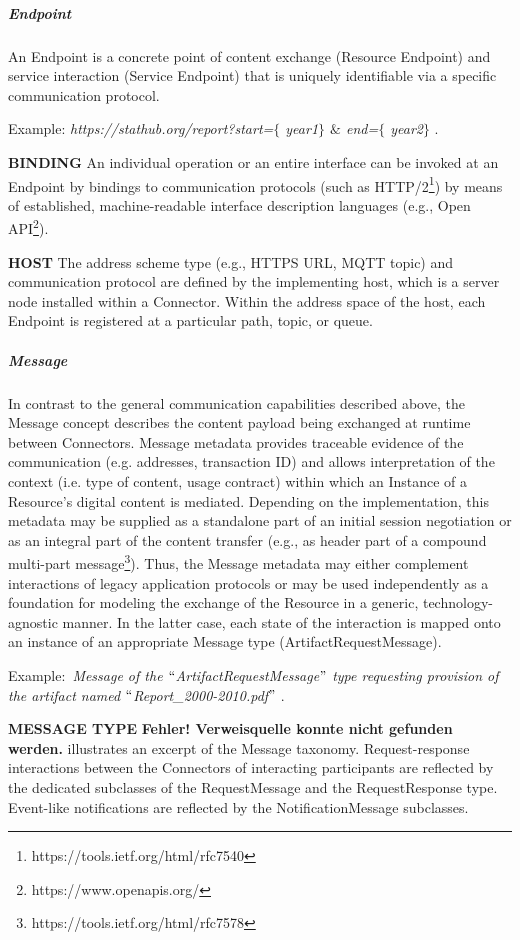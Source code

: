 

\subparagraph*{Endpoint}
An Endpoint is a concrete point of content exchange (Resource Endpoint) and service interaction (Service Endpoint) that is uniquely identifiable via a specific communication protocol.

Example: \textit{https://stathub.org/report?start=$ \{ $ year1$ \} $ $\&$ end=$ \{ $ year2$ \} $ }.

\textbf{BINDING }An individual operation or an entire interface can be invoked at an Endpoint by bindings to communication protocols (such as HTTP/2\footnote{https://tools.ietf.org/html/rfc7540 }) by means of established, machine-readable interface description languages (e.g., Open API\footnote{https://www.openapis.org/ }).

\textbf{HOST }The address scheme type (e.g., HTTPS URL, MQTT topic) and communication protocol are defined by the implementing host, which is a server node installed within a Connector. Within the address space of the host, each Endpoint is registered at a particular path, topic, or queue. 

\subparagraph*{Message}
In contrast to the general communication capabilities described above, the Message concept describes the content payload being exchanged at runtime between Connectors. Message metadata provides traceable evidence of the communication (e.g. addresses, transaction ID) and allows interpretation of the context (i.e. type of content, usage contract) within which an Instance of a Resource’s digital content is mediated. Depending on the implementation, this metadata may be supplied as a standalone part of an initial session negotiation or as an integral part of the content transfer (e.g., as header part of a compound multi-part message\footnote{https://tools.ietf.org/html/rfc7578 }). Thus, the Message metadata may either complement interactions of legacy application protocols or may be used independently as a foundation for modeling the exchange of the Resource in a generic, technology-agnostic manner. In the latter case, each state of the interaction is mapped onto an instance of an appropriate Message type (ArtifactRequestMessage). 

Example:\  \textit{Message of the $``$ArtifactRequestMessage$"$  type requesting provision of the artifact named $``$Report\_2000-2010.pdf$"$ }. 

\textbf{MESSAGE TYPE }\textbf{Fehler! Verweisquelle konnte nicht gefunden werden.} illustrates an excerpt of the Message taxonomy. Request-response interactions between the Connectors of interacting participants are reflected by the dedicated subclasses of the RequestMessage and the RequestResponse type. Event-like notifications are reflected by the NotificationMessage subclasses.



